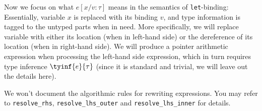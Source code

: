 Now we focus on what $e[x/v:\tau]$ means in the semantics of \texttt{let}-binding:
Essentially, variable $x$ is replaced with its binding $v$, and type information is tagged to the untyped parts when in need.
More specifically, we will replace variable with either its location (when in left-hand side)
or the dereference of its location (when in right-hand side). We will produce a pointer arithmetic
expression when processing the left-hand side expression, which in turn requires type inference $\tyinf{e}{\tau}$
(since it is standard and trivial, we will leave out the details here).

We won't document the algorithmic rules for rewriting expressions.
You may refer to \texttt{resolve\_rhs}, \texttt{resolve\_lhs\_outer} and \texttt{resolve\_lhs\_inner} for details.
